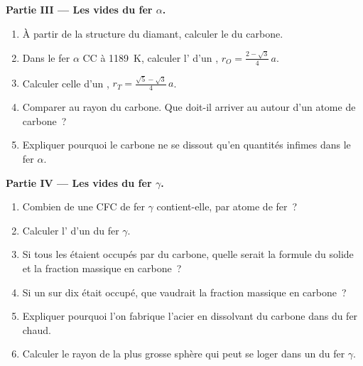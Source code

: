 \begin{problem}
\medskip
\noindent\textbf{Partie III --- Les vides du fer $\alpha$.}
\begin{enumerate}[resume]
  \item À partir de la structure du diamant, calculer le 
        du carbone.
  \item Dans le fer $\alpha$ CC à \qty{1189}{K}, calculer l'
        d'un , $r_O = \frac{2 - \sqrt3}{4}\,a$.
  \item Calculer celle d'un , $r_T = \frac{\sqrt5 -
        \sqrt3}{4}\,a$.
  \item Comparer au rayon du carbone. Que doit-il arriver au 
        autour d'un atome de carbone~?
  \item Expliquer pourquoi le carbone ne se dissout qu'en quantités
        infimes dans le fer $\alpha$.
\end{enumerate}

\medskip
\noindent\textbf{Partie IV --- Les vides du fer $\gamma$.}
\begin{enumerate}[resume]
  \item Combien de  une  CFC de fer $\gamma$
        contient-elle, par atome de fer~?
  \item Calculer l' d'un  du fer $\gamma$.
  \item Si tous les  étaient occupés par du carbone,
        quelle serait la formule du solide et la fraction massique en
        carbone~?
  \item Si un  sur dix était occupé, que vaudrait la
        fraction massique en carbone~?
  \item Expliquer pourquoi l'on fabrique l'acier en dissolvant du
        carbone dans du fer chaud.
  \item Calculer le rayon de la plus grosse sphère qui peut se loger
        dans un  du fer $\gamma$.
\end{enumerate}
\end{problem}
